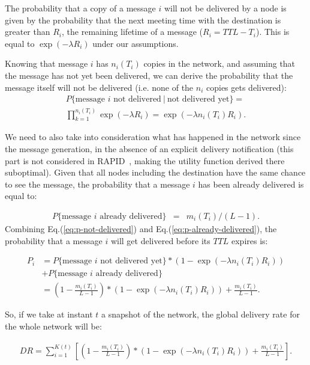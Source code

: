 The probability that a copy of a message $i$ will not be delivered by a node is given by the probability that the next meeting time with the destination is greater than $R_i$, the remaining lifetime of a message ($R_{i} = TTL - T_{i}$). This is equal to $\exp(-\lambda{R_i})$ under our assumptions.

Knowing that message $i$ has $n_i(T_i)$ copies in the network, and assuming that the message has not yet been delivered, we can derive the probability that the message itself will not be delivered (i.e. none of the $n_{i}$ copies gets delivered):
\begin{eqnarray}
P\{\mbox{message\ $i$ not\ delivered}\ |\ \mbox{not\ delivered\ yet}  \}= \nonumber \\
\prod_{k=1}^{n_i(T_i)}\exp(-\lambda R_i ) = \exp(-\lambda n_i(T_i) R_i).
\label{eq:p-not-delivered}
\end{eqnarray}

We need to also take into consideration what has happened in the network since the message generation, in the absence of an explicit delivery notification (this part is not considered in RAPID~\cite{Levine:Sigcomm07}, making the utility function derived there suboptimal). Given that all nodes including the destination have the same chance to see the message, the probability that a message $i$ has
been already delivered is equal to:

\begin{align}
P \{ \mbox{message\ $i$ already\ delivered} \} &=& m_i(T_i) / (L-1).
\label{eq:p-already-delivered}
\end{align}
Combining Eq.(\ref{eq:p-not-delivered}) and Eq.(\ref{eq:p-already-delivered}), the probability that a message $i$ will get delivered before its $TTL$ expires is:

\vspace{-0.4cm}
\small
\begin{align*}
P_i & =  P \{ \mbox{message\ $i$ not\ delivered\ yet} \} *  (1 -\exp(-\lambda n_i(T_i) R_i)) \\
& +  P \{ \mbox{message\ $i$ already delivered} \} \\
& =  (1 - \frac{m_i(T_i)}{L-1})*(1 - \exp(-\lambda n_i(T_i) R_i ))+\frac{m_i(T_i)}{L-1}.
\end{align*}
\normalsize

So, if we take at instant $t$ a snapshot of the network,
the global delivery rate for the whole network will be:

\vspace{-0.4cm}
\small
\begin{align*} DR =\sum_{i=1}^{K(t)}\left[(1 - \frac{m_i(T_i)}{L-1})*(1 -\exp(-\lambda n_i(T_i)  R_i )) +\frac{m_i(T_i)}{L-1}\right].
\end{align*}
\normalsize

